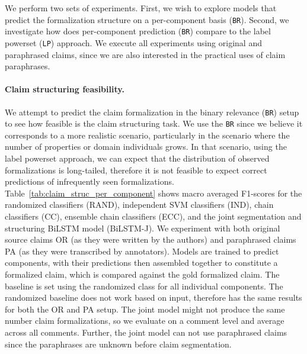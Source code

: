 We perform two sets of experiments. First, we wish to explore models
that predict the formalization structure on a per-component basis (\texttt{BR}). 
Second, we investigate how does per-component prediction (\texttt{BR}) compare to 
the label powerset (\texttt{LP}) approach.
We execute all experiments using original and paraphrased claims, since we are
also interested in the practical uses of claim paraphrases.

\paragraph{Claim structuring feasibility. }
We attempt to predict the claim formalization in the binary
relevance (\texttt{BR}) setup to see how feasible is the claim 
structuring task. We use the \texttt{BR} since we believe it corresponds
to a more realistic scenario, particularly in the scenario where the number
of properties or domain individuals grows. In that scenario, using the
label powerset approach, we can expect that the
distribution of observed formalizations is long-tailed, therefore it is not
feasible to expect correct predictions of infrequently seen formalizations.
Table~\ref{tab:claim_struc_per_component} shows macro averaged F1-scores for
the randomized classifiers (RAND), independent SVM classifiers (IND), chain
classifiers (CC), ensemble chain classifiers (ECC), and the joint segmentation
and structuring BiLSTM model (BiLSTM-J). We experiment with both original
source claims OR (as they were written by the authors) and paraphrased claims PA (as
they were transcribed by annotators).
Models are trained to predict components, with their predictions then assembled
together to constitute a formalized claim, which is compared against the gold
formalized claim.  The baseline is set using the randomized 
class for all individual components. The randomized baseline does not work 
based on input, therefore has the same results for both the OR and PA setup. 
The joint model might not produce the same number claim formalizations, 
so we evaluate on a comment level and average across all comments. Further, the joint
model can not use paraphrased claims since the paraphrases are unknown 
before claim segmentation.  

